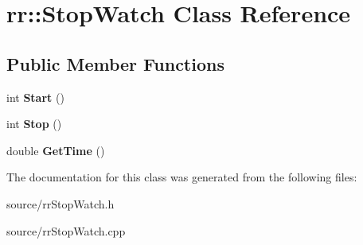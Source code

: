 \hypertarget{classrr_1_1_stop_watch}{\section{rr\-:\-:Stop\-Watch Class Reference}
\label{classrr_1_1_stop_watch}
}
\subsection*{Public Member Functions}
\begin{DoxyCompactItemize}
\item 
\hypertarget{classrr_1_1_stop_watch_af5dfd29ecf123122a6d0e0155c68b01e}{int {\bfseries Start} ()}\label{classrr_1_1_stop_watch_af5dfd29ecf123122a6d0e0155c68b01e}

\item 
\hypertarget{classrr_1_1_stop_watch_a12d672480c4049a37498d25c04d6a665}{int {\bfseries Stop} ()}\label{classrr_1_1_stop_watch_a12d672480c4049a37498d25c04d6a665}

\item 
\hypertarget{classrr_1_1_stop_watch_a1e70bfda869692622498edb043828bd1}{double {\bfseries Get\-Time} ()}\label{classrr_1_1_stop_watch_a1e70bfda869692622498edb043828bd1}

\end{DoxyCompactItemize}


The documentation for this class was generated from the following files\-:\begin{DoxyCompactItemize}
\item 
source/rr\-Stop\-Watch.\-h\item 
source/rr\-Stop\-Watch.\-cpp\end{DoxyCompactItemize}
